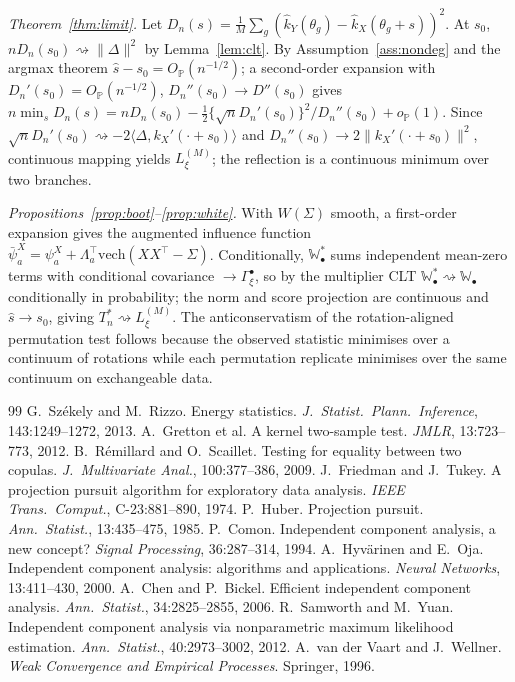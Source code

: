 \documentclass[]{interact}
\theoremstyle{plain}
\theoremstyle{remark}
\newcommand{\Prob}{\mathbb{P}}
\newcommand{\weakto}{\rightsquigarrow}
\newcommand{\Gp}{\mathbb{W}}
\begin{document}
\medskip\noindent\emph{Theorem~\ref{thm:limit}.} Let $D_n(s)=\frac1M\sum_g(\hat
k_Y(\theta_g)-\hat k_X(\theta_g+s))^2$. At $s_0$, $nD_n(s_0)\weakto\|\Delta\|^2$ by
Lemma~\ref{lem:clt}. By Assumption~\ref{ass:nondeg} and the argmax theorem
$\hat s-s_0=O_\Prob(n^{-1/2})$; a second-order expansion with $D_n'(s_0)=
O_\Prob(n^{-1/2})$, $D_n''(s_0)\to D''(s_0)$ gives $n\min_s D_n(s)=nD_n(s_0)-
\tfrac12\{\sqrt n D_n'(s_0)\}^2/D_n''(s_0)+o_\Prob(1)$. Since $\sqrt n D_n'(s_0)
\weakto-2\langle\Delta,k_X'(\cdot+s_0)\rangle$ and $D_n''(s_0)\to2\|k_X'(\cdot+s_0)
\|^2$, continuous mapping yields $L_\xi^{(M)}$; the reflection is a continuous
minimum over two branches.

\medskip\noindent\emph{Propositions~\ref{prop:boot}--\ref{prop:white}.} With
$W(\Sigma)$ smooth, a first-order expansion gives the augmented influence function
$\bar\psi^X_a=\psi^X_a+\Lambda_a^\top\mathrm{vech}(XX^\top-\Sigma)$. Conditionally,
$\Gp^{*}_\bullet$ sums independent mean-zero terms with conditional covariance
$\to\Gamma_\xi^\bullet$, so by the multiplier CLT $\Gp^{*}_\bullet\weakto
\Gp_\bullet$ conditionally in probability; the norm and score projection are
continuous and $\hat s\to s_0$, giving $T_n^{*}\weakto L_\xi^{(M)}$. The
anticonservatism of the rotation-aligned permutation test follows because the
observed statistic minimises over a continuum of rotations while each permutation
replicate minimises over the same continuum on exchangeable data.

\begin{thebibliography}{99}
 G.~Sz\'ekely and M.~Rizzo. Energy statistics.
\emph{J.\ Statist.\ Plann.\ Inference}, 143:1249--1272, 2013.
 A.~Gretton et al. A kernel two-sample test. \emph{JMLR},
13:723--773, 2012.
 B.~R\'emillard and O.~Scaillet. Testing for equality between
two copulas. \emph{J.\ Multivariate Anal.}, 100:377--386, 2009.
 J.~Friedman and J.~Tukey. A projection pursuit algorithm for
exploratory data analysis. \emph{IEEE Trans.\ Comput.}, C-23:881--890, 1974.
 P.~Huber. Projection pursuit. \emph{Ann.\ Statist.},
13:435--475, 1985.
 P.~Comon. Independent component analysis, a new concept?
\emph{Signal Processing}, 36:287--314, 1994.
 A.~Hyv\"arinen and E.~Oja. Independent component analysis:
algorithms and applications. \emph{Neural Networks}, 13:411--430, 2000.
 A.~Chen and P.~Bickel. Efficient independent component
analysis. \emph{Ann.\ Statist.}, 34:2825--2855, 2006.
 R.~Samworth and M.~Yuan. Independent component analysis via
nonparametric maximum likelihood estimation. \emph{Ann.\ Statist.},
40:2973--3002, 2012.
 A.~van der Vaart and J.~Wellner. \emph{Weak Convergence and
Empirical Processes}. Springer, 1996.
\end{thebibliography}
\end{document}
